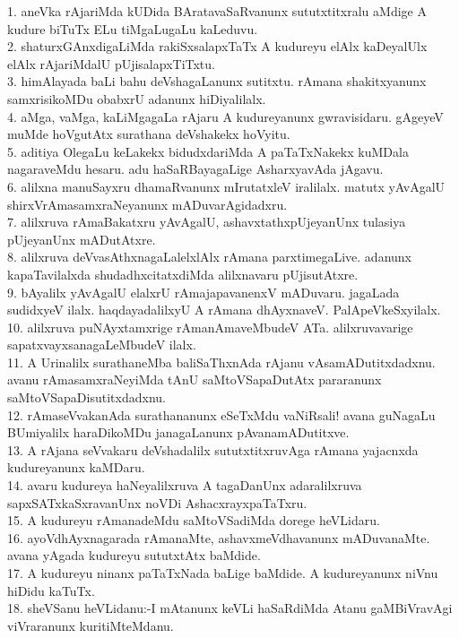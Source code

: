 \documentclass{article}
\begin{document}
1. aneVka rAjariMda kUDida BAratavaSaRvanunx sututxtitxralu aMdige A kudure biTuTx ELu tiMgaLugaLu kaLeduvu.\\
2. shaturxGAnxdigaLiMda rakiSxsalapxTaTx A kudureyu elAlx kaDeyalUlx elAlx rAjariMdalU pUjisalapxTiTxtu.\\
3. himAlayada baLi bahu deVshagaLanunx sutitxtu. rAmana shakitxyanunx samxrisikoMDu obabxrU adanunx hiDiyalilalx.\\
4. aMga, vaMga, kaLiMgagaLa rAjaru A kudureyanunx gwravisidaru. gAgeyeV muMde hoVgutAtx surathana deVshakekx hoVyitu.\\
5. aditiya OlegaLu keLakekx bidudxdariMda A paTaTxNakekx kuMDala nagaraveMdu hesaru. adu haSaRBayagaLige AsharxyavAda jAgavu.\\
6. alilxna manuSayxru dhamaRvanunx mIrutatxleV iralilalx. matutx yAvAgalU shirxVrAmasamxraNeyanunx mADuvarAgidadxru.\\
7. alilxruva rAmaBakatxru yAvAgalU, ashavxtathxpUjeyanUnx tulasiya pUjeyanUnx mADutAtxre.\\
8. alilxruva deVvasAthxnagaLalelxlAlx rAmana parxtimegaLive. adanunx kapaTavilalxda shudadhxcitatxdiMda alilxnavaru pUjisutAtxre.\\
9. bAyalilx yAvAgalU elalxrU rAmajapavanenxV mADuvaru. jagaLada sudidxyeV ilalx. haqdayadalilxyU A rAmana dhAyxnaveV. PalApeVkeSxyilalx.\\
10. alilxruva puNAyxtamxrige rAmanAmaveMbudeV ATa. alilxruvavarige sapatxvayxsanagaLeMbudeV ilalx.\\
11. A Urinalilx surathaneMba baliSaThxnAda rAjanu vAsamADutitxdadxnu. avanu rAmasamxraNeyiMda tAnU saMtoVSapaDutAtx pararanunx saMtoVSapaDisutitxdadxnu.\\
12. rAmaseVvakanAda surathananunx eSeTxMdu vaNiRsali! avana guNagaLu BUmiyalilx haraDikoMDu janagaLanunx pAvanamADutitxve.\\
13. A rAjana seVvakaru deVshadalilx sututxtitxruvAga rAmana yajacnxda kudureyanunx kaMDaru.\\
14. avaru kudureya haNeyalilxruva A tagaDanUnx adaralilxruva sapxSATxkaSxravanUnx noVDi AshacxrayxpaTaTxru.\\
15. A kudureyu rAmanadeMdu saMtoVSadiMda dorege heVLidaru.\\
16. ayoVdhAyxnagarada rAmanaMte, ashavxmeVdhavanunx mADuvanaMte. avana yAgada kudureyu sututxtAtx baMdide.\\
17. A kudureyu ninanx paTaTxNada baLige baMdide. A kudureyanunx niVnu hiDidu kaTuTx.\\
18. sheVSanu heVLidanu:-I mAtanunx keVLi haSaRdiMda Atanu gaMBiVravAgi viVraranunx kuritiMteMdanu.\\
\end{document}
